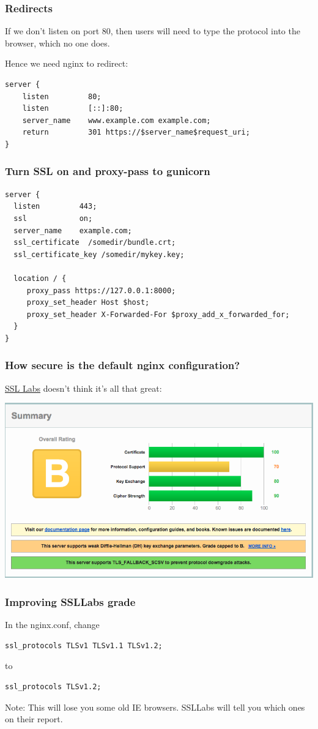\documentclass[9pt]{beamer}
\begin{document}
\begin{frame}[fragile]
\frametitle{Redirects}
If we don't listen on port 80, then users will need to type the protocol into the browser, which no one does. 

Hence we need nginx to redirect:
\begin{verbatim}
server {
    listen         80;
    listen         [::]:80;
    server_name    www.example.com example.com;
    return         301 https://$server_name$request_uri;
}
\end{verbatim}
\end{frame}

\begin{frame}[fragile]
\frametitle{Turn SSL on and proxy-pass to gunicorn}
\begin{verbatim}
server {
  listen         443;
  ssl            on;
  server_name    example.com;
  ssl_certificate  /somedir/bundle.crt;
  ssl_certificate_key /somedir/mykey.key;

  location / {
     proxy_pass https://127.0.0.1:8000;
     proxy_set_header Host $host;
     proxy_set_header X-Forwarded-For $proxy_add_x_forwarded_for;
  }
}
\end{verbatim}
\end{frame}

\begin{frame}[fragile]
\frametitle{How secure is the default nginx configuration?}
\href{https://www.ssllabs.com/ssltest/analyze.html}{SSL Labs} doesn't think it's all that great:

\includegraphics[scale=0.25]{figures/SSLLabsFirstGrade.png}
\end{frame}

\begin{frame}[fragile]
\frametitle{Improving SSLLabs grade}
In the nginx.conf, change 
\begin{verbatim}
ssl_protocols TLSv1 TLSv1.1 TLSv1.2;
\end{verbatim}
to
\begin{verbatim}
ssl_protocols TLSv1.2;
\end{verbatim}
Note: This will lose you some old IE browsers. SSLLabs will tell you which ones on their report.
\end{frame}
\end{document}
